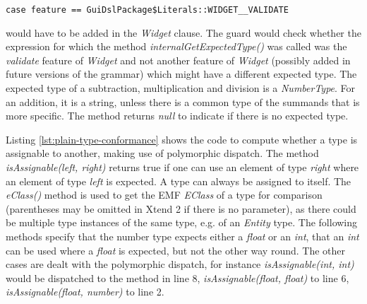 \verb|case feature == GuiDslPackage$Literals::WIDGET__VALIDATE| %

\noindent would have to be added in the \emph{Widget} clause. The guard would check whether the expression for which the method \emph{internalGetExpectedType()} was called was the \emph{validate} feature of \emph{Widget} and not another feature of \emph{Widget} (possibly added in future versions of the grammar) which might have a different expected type. The expected type of a subtraction, multiplication and division is a \emph{NumberType}. For an addition, it is a string, unless there is a common type of the summands that is more specific. The method returns \emph{null} to indicate if there is no expected type.



Listing \ref{lst:plain-type-conformance} shows the code to compute whether a type is assignable to another, making use of polymorphic dispatch. The method \emph{isAssignable(left, right)} returns true if one can use an element of type \emph{right} where an element of type \emph{left} is expected. A type can always be assigned to itself. The \emph{eClass()} method is used to get the EMF \emph{EClass} of a type for comparison (parentheses may be omitted in Xtend 2 if there is no parameter), as there could be multiple type instances of the same type, e.g. of an \emph{Entity} type.
The following methods specify that the number type expects either a \emph{float} or an \emph{int}, that an \emph{int} can be used where a \emph{float} is expected, but not the other way round. The other cases are dealt with the polymorphic dispatch, for instance \emph{isAssignable(int, int)} would be dispatched to the method in line 8, \emph{isAssignable(float, float)} to line 6, \emph{isAssignable(float, number)} to line 2.



